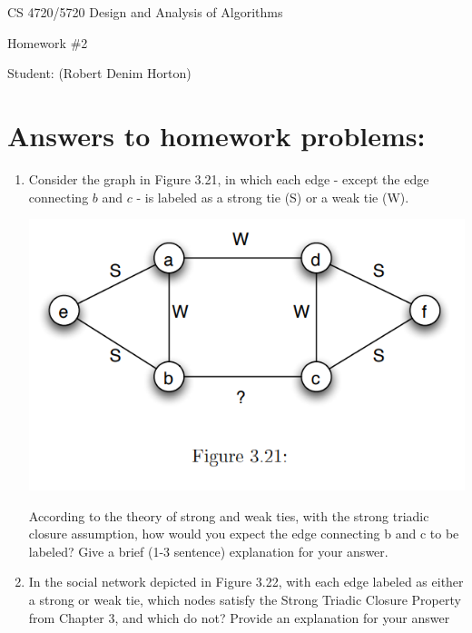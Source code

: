 \documentclass[11pt]{article}
\begin{document}
 

\rhead{\today}

\begin{center}\begin{Large}
CS 4720/5720 Design and Analysis of Algorithms

Homework \#2

Student: (Robert Denim Horton)
\end{Large}
\end{center}


\section*{Answers to homework problems:}

\begin{enumerate}
\item Consider the graph in Figure 3.21, in which each edge - except the edge connecting $b$ and $c$ - is labeled as a strong tie (S) or a weak tie (W).\\
\begin{center}
	\includegraphics[scale=0.6]{Figure_3_21}
\end{center}
According to the theory of strong and weak ties, with the strong triadic closure assumption, how would you expect the edge connecting b and c to be labeled? Give a brief (1-3 sentence) explanation for your answer.
\item  In the social network depicted in Figure 3.22, with each edge labeled as either a strong or weak tie, which nodes satisfy the Strong Triadic Closure Property from Chapter 3, and which do not? Provide an explanation for your answer
\begin{center}

\end{center}
\end{enumerate}
\end{document}
